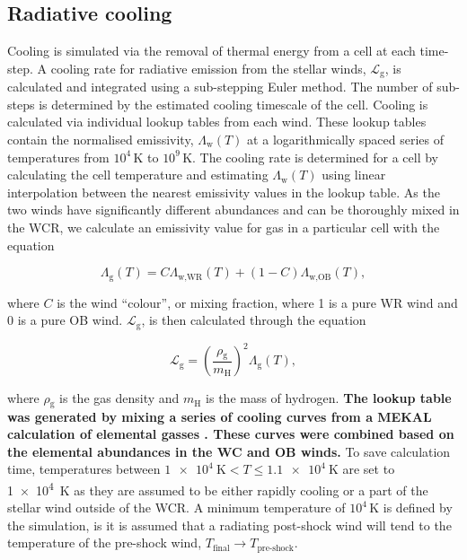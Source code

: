 \documentclass[fleqn,usenatbib]{mnras}
\newcommand{\rms}[1]{\ensuremath{_{\text{#1}}}}
\begin{document}
\subsection{Radiative cooling}

Cooling is simulated via the removal of thermal energy from a cell at each time-step.
A cooling rate for radiative emission from the stellar winds, $\mathcal{L}\rms{g}$, is calculated and integrated using a sub-stepping Euler method.
The number of sub-steps is determined by the estimated cooling timescale of the cell.
Cooling is calculated via individual lookup tables from each wind.
These lookup tables contain the normalised emissivity, $\Lambda\rms{w}(T)$ at a logarithmically spaced series of temperatures from $10^4 \, \si{\kelvin}$ to $10^9 \, \si{\kelvin}$.
The cooling rate is determined for a cell by calculating the cell temperature and estimating $\Lambda\rms{w}(T)$ using linear interpolation between the nearest emissivity values in the lookup table.
As the two winds have significantly different abundances and can be thoroughly mixed in the WCR, we calculate an emissivity value for gas in a particular cell with the equation

\begin{equation}
  \Lambda\rms{g}(T) = C\Lambda\rms{w,WR}(T) + (1-C)\Lambda\rms{w,OB}(T) , 
  \label{eq:p2-c}
\end{equation}

\noindent
where $C$ is the wind ``colour'', or mixing fraction, where 1 is a pure WR wind and 0 is a pure OB wind.
$\mathcal{L}\rms{g}$, is then calculated through the equation

\begin{equation}
  \mathcal{L}\rms{g} = \left(\frac{\rho\rms{g}}{m\rms{H}}\right)^2 \Lambda\rms{g}(T),
\end{equation}

\noindent
where $\rho\rms{g}$ is the gas density and $m\rms{H}$ is the mass of hydrogen.
\textbf{The lookup table was generated by mixing a series of cooling curves from a MEKAL calculation of elemental gasses \citep{mewe1995update}.
These curves were combined based on the elemental abundances in the WC \citep{sanderGalacticWCStars2012} and OB \citep{andersAbundancesElementsMeteoritic1989} winds.}
To save calculation time, temperatures between $\SI{1e4}{\kelvin} < T \leq \SI{1.1e4}{\kelvin}$ are set to \SI{1e4}{\kelvin} as they are assumed to be either rapidly cooling or a part of the stellar wind outside of the WCR.
A minimum temperature of $10^4 \, \si{\kelvin}$ is defined by the simulation, is it is assumed that a radiating post-shock wind will tend to the temperature of the pre-shock wind, $T\rms{final} \rightarrow T\rms{pre-shock}$.
\end{document}
